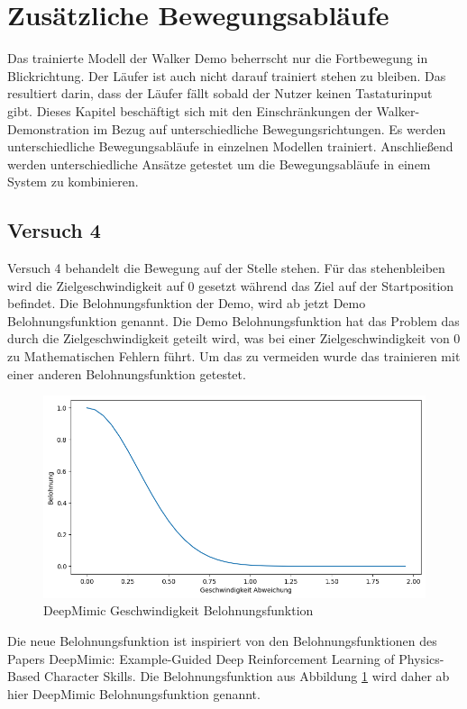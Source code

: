 \section{Zusätzliche Bewegungsabläufe}
Das trainierte Modell der Walker Demo beherrscht nur die Fortbewegung in Blickrichtung. Der Läufer ist auch nicht darauf trainiert stehen zu bleiben. Das resultiert darin, dass der Läufer fällt sobald der Nutzer keinen Tastaturinput gibt. Dieses Kapitel beschäftigt sich mit den Einschränkungen der Walker-Demonstration im Bezug auf unterschiedliche Bewegungsrichtungen. Es werden unterschiedliche Bewegungsabläufe in einzelnen Modellen trainiert. Anschließend werden unterschiedliche Ansätze getestet um die Bewegungsabläufe in einem System zu kombinieren.

\subsection{Versuch 4}
\label{subsec:versuch4}
Versuch 4 behandelt die Bewegung auf der Stelle stehen. Für das stehenbleiben wird die Zielgeschwindigkeit auf 0 gesetzt während das Ziel auf der Startposition befindet. Die Belohnungsfunktion der Demo, wird ab jetzt Demo Belohnungsfunktion genannt. Die Demo Belohnungsfunktion hat das Problem das durch die Zielgeschwindigkeit geteilt wird, was bei einer Zielgeschwindigkeit von 0 zu Mathematischen Fehlern führt. Um das zu vermeiden wurde das trainieren mit einer anderen Belohnungsfunktion getestet.
\begin{figure}[H]
  \centering  
  \includegraphics[scale=0.5]{img/plot_deepmimic_vel}
  \caption{DeepMimic Geschwindigkeit Belohnungsfunktion}
  \label{fig:plot_deepmimic_vel}
\end{figure}
Die neue Belohnungsfunktion ist inspiriert von den Belohnungsfunktionen des Papers \grqq{}DeepMimic: Example-Guided Deep Reinforcement Learning of Physics-Based Character Skills\grqq{}.\cite{peng2018deepmimic}
Die Belohnungsfunktion aus Abbildung \ref{fig:plot_deepmimic_vel} wird daher ab hier DeepMimic Belohnungsfunktion genannt.

